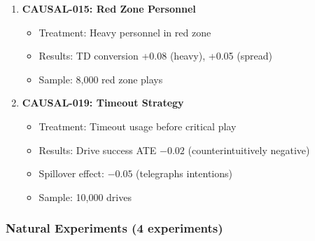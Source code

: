 \begin{enumerate}[resume]
    \item \textbf{CAUSAL-015: Red Zone Personnel} \checkmark
    \begin{itemize}
        \item Treatment: Heavy personnel in red zone
        \item Results: TD conversion +0.08 (heavy), +0.05 (spread)
        \item Sample: 8,000 red zone plays
    \end{itemize}

    \item \textbf{CAUSAL-019: Timeout Strategy} \checkmark
    \begin{itemize}
        \item Treatment: Timeout usage before critical play
        \item Results: Drive success ATE $-0.02$ (counterintuitively negative)
        \item Spillover effect: $-0.05$ (telegraphs intentions)
        \item Sample: 10,000 drives
    \end{itemize}
\end{enumerate}

\subsubsection{Natural Experiments (4 experiments)}

